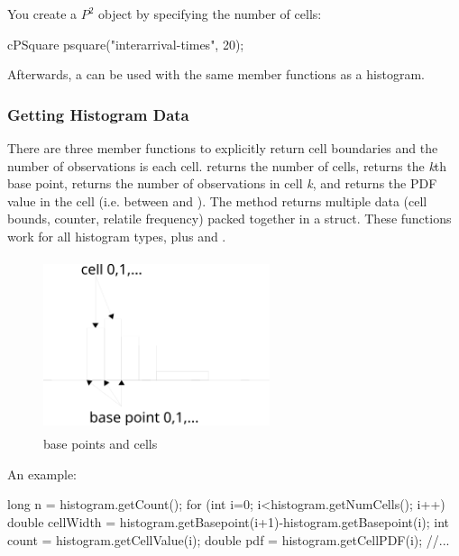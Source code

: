 You create a $P^{2}$ object by specifying the number of cells:

\begin{cpp}
cPSquare psquare("interarrival-times", 20);
\end{cpp}

Afterwards, a  can be used with the same member functions
as a histogram.


\subsubsection{Getting Histogram Data}


There are three member functions to explicitly return cell boundaries
and the number of observations is each cell.  returns
the number of cells,  returns the
\textit{k}th base point,  returns the
number of observations in cell \textit{k}, and
 returns the PDF value in the cell
(i.e. between  and
).
The  method returns multiple data
(cell bounds, counter, relatile frequency) packed together in a struct.
These functions work for all histogram types, plus 
and .

\begin{figure}[htbp]
  \begin{center}
    \includegraphics[width=2.615in, height=2.001in]{figures/simlib-histogramcells}
    \caption{base points and cells}
  \end{center}
\end{figure}

An example:

\begin{cpp}
long n = histogram.getCount();
for (int i=0; i<histogram.getNumCells(); i++)
{
  double cellWidth = histogram.getBasepoint(i+1)-histogram.getBasepoint(i);
  int count = histogram.getCellValue(i);
  double pdf = histogram.getCellPDF(i);
  //...
}
\end{cpp}



